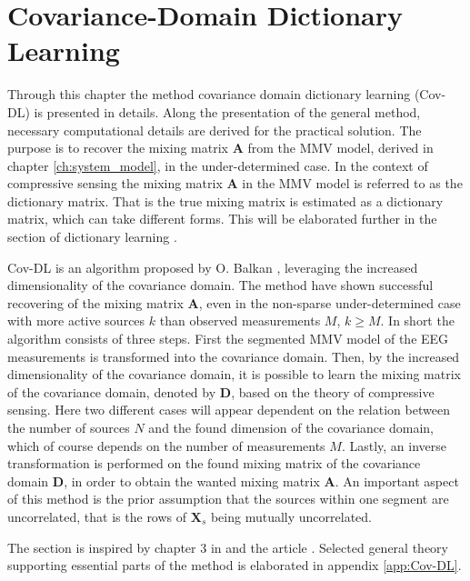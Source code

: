 \chapter{Covariance-Domain Dictionary Learning}\label{ch:Cov-DL}
Through this chapter the method covariance domain dictionary learning (Cov-DL) is presented in details. 
Along the presentation of the general method, necessary computational details are derived for the practical solution.
The purpose is to recover the mixing matrix $\mathbf{A}$ from the MMV model, derived in chapter \ref{ch:system_model}, in the under-determined case.   
In the context of compressive sensing the mixing matrix $\mathbf{A}$ in the MMV model is referred to as the dictionary matrix. 
That is the true mixing matrix is estimated as a dictionary matrix, which can take different forms. 
This will be elaborated further in the section of dictionary learning .  

Cov-DL is an algorithm proposed by O. Balkan \cite{Balkan2015}, leveraging the increased dimensionality of the covariance domain. 
The method have shown successful recovering of the mixing matrix $\mathbf{A}$, even in the non-sparse under-determined case with more active sources $k$ than observed measurements $M$, $k \geq M$. 
In short the algorithm consists of three steps. 
First the segmented MMV model of the EEG measurements is transformed into the covariance domain. 
Then, by the increased dimensionality of the covariance domain, it is possible to learn the mixing matrix of the covariance domain, denoted by $\mathbf{D}$, based on the theory of compressive sensing. 
Here two different cases will appear dependent on the relation between the number of sources $N$ and the found dimension of the covariance domain, which of course depends on the number of measurements $M$. 
Lastly, an inverse transformation is performed on the found mixing matrix of the covariance domain $\mathbf{D}$, in order to obtain the wanted mixing matrix $\mathbf{A}$. 
An important aspect of this method is the prior assumption that the sources within one segment are uncorrelated, that is the rows of $\mathbf{X}_s$ being mutually uncorrelated. 

The section is inspired by chapter 3 in \cite{phd2015} and the article \cite{Balkan2015}. Selected general theory supporting essential parts of the method is elaborated in appendix \ref{app:Cov-DL}.


%